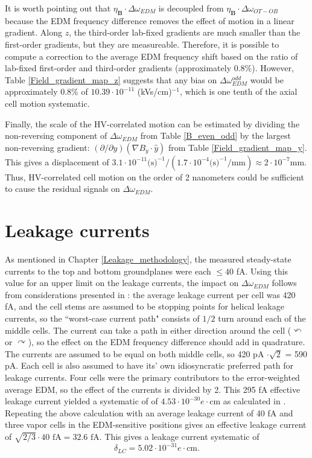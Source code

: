 \documentclass [10pt, twoside] {uwthesis}[2012/04/02]
\begin{document}
It is worth pointing out that $\eta_{\mathbf{B}}\cdot\Delta\omega_{EDM}$ is decoupled from $\eta_{\mathbf{B}}\cdot\Delta\omega_{OT-OB}$ because the EDM frequency difference removes the effect of motion in a linear gradient. Along $z$, the third-order lab-fixed gradients are much smaller than the first-order gradients, but they are measureable. Therefore, it is possible to compute a correction to the average EDM frequency shift based on the ratio of lab-fixed first-order and third-order gradients (approximately 0.8\%). However, Table \ref{Field_gradient_map_z} suggests that any bias on $\Delta\omega^{odd}_{EDM}$ would be approximately 0.8\% of $10.39\cdot 10^{-11}$ (kVs/cm)$^{-1}$, which is one tenth of the axial cell motion systematic.

Finally, the scale of the HV-correlated motion can be estimated by dividing the non-reversing component of $\Delta\omega_{EDM}$ from Table \ref{B_even_odd} by the largest non-reversing gradient: $(\partial/\partial y)(\nabla B_y\cdot\hat{y})$ from Table \ref{Field_gradient_map_y}. This gives a displacement of $3.1\cdot10^{-11} \text{(s)}^{-1} /( 1.7 \cdot 10^{-4} \text{(s)}^{-1}\text{/mm}) \approx 2\cdot10^{-7} \text{mm}$. Thus, HV-correlated cell motion on the order of 2 nanometers could be sufficient to cause the residual signals on $\Delta\omega_{EDM}.$ 

\section{Leakage currents} \label{leakage_systematic}
As mentioned in Chapter \ref{Leakage_methodology}, the measured steady-state currents to the top and bottom groundplanes were each $\le 40$ fA. Using this value for an upper limit on the leakage currents, the impact on $\Delta\omega_{EDM}$ follows from considerations presented in \cite{2009_Hg_EDM}: the average leakage current per cell was 420 fA, and the cell stems are assumed to be stopping points for helical leakage currents, so the ``worst-case current path" consists of $1/2$ turn around each of the middle cells. The current can take a path in either direction around the cell ($\curvearrowleft$ or $\curvearrowright$), so the effect on the EDM frequency difference should add in quadrature. The currents are assumed to be equal on both middle cells, so 420 pA $\cdot \sqrt{2}$ = 590 pA. Each cell is also assumed to have its' own idiosyncratic preferred path for leakage currents. Four cells were the primary contributors to the error-weighted average EDM, so the effect of the currents is divided by 2. This 295 fA effective leakage current yielded a systematic of of $4.53\cdot10^{-30} e\cdot \text{cm}$ as calculated in \cite{2013_Hg_EDM_PRA}. Repeating the above calculation with an average leakage current of 40 fA and three vapor cells in the EDM-sensitive positions gives an effective leakage current of $\sqrt{2/3}\cdot\text{40 fA} = \text{32.6 fA}$. This gives a leakage current systematic of 
\begin{equation}
\delta_{LC} = 5.02 \cdot 10^{-31} e\cdot \text{cm}.
\end{equation}
\end{document}
